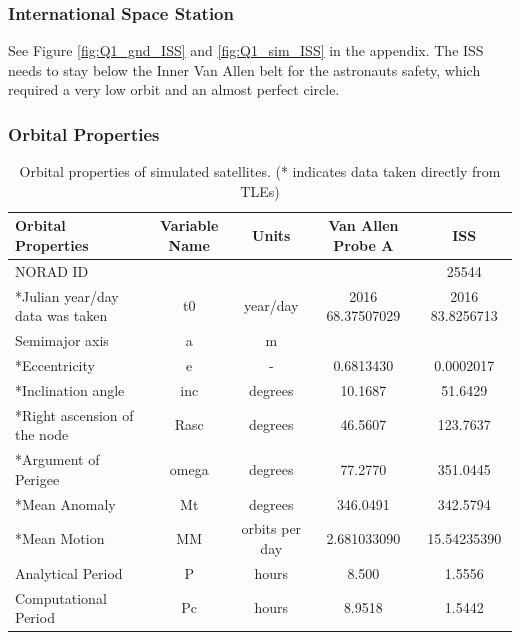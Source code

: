 \documentclass[Space3_Assign1.tex]{subfiles}
\begin{document}
\subsubsection{International Space Station}
See Figure \ref{fig:Q1_gnd_ISS} and \ref{fig:Q1_sim_ISS} in the appendix. The ISS needs to stay below the Inner Van Allen belt for the astronauts safety, which required a very low orbit and an almost perfect circle.


\subsubsection{Orbital Properties}
\begin{table}[h!]
\centering
\caption{Orbital properties of simulated satellites. (* indicates data taken directly from TLEs)}
\label{Q1.orbitprop}
\begin{tabular}{|l|c|c|c|c|}
	\hline
	Orbital Properties              & Variable Name &     Units      & Van Allen Probe A &     ISS      \\ \hline
	NORAD ID                        &               &                &                   &      25544       \\ \hline
	*Julian year/day data was taken &      t0       &    year/day    & 2016 68.37507029  & 2016 83.8256713 \\ \hline
	Semimajor axis                  &       a       &       m        &                   &    \\ \hline
	*Eccentricity                   &       e       &       -        &     0.6813430     &    0.0002017     \\ \hline
	*Inclination angle              &      inc      &    degrees     &      10.1687      &      51.6429      \\ \hline
	*Right ascension of the node    &     Rasc      &    degrees     &      46.5607      &     123.7637     \\ \hline
	*Argument of Perigee            &     omega     &    degrees     &      77.2770      &     351.0445     \\ \hline
	*Mean Anomaly                   &      Mt       &    degrees     &     346.0491      &     342.5794      \\\hline
	*Mean Motion             &      MM       & orbits per day &    2.681033090    &     15.54235390      \\ \hline
	Analytical Period               &     P          &        hours        &        8.500         & 1.5556 \\ \hline
	Computational Period            &  Pc             &            hours    &   8.9518                & 1.5442 \\ \hline
\end{tabular}
\end{table}
\end{document}
